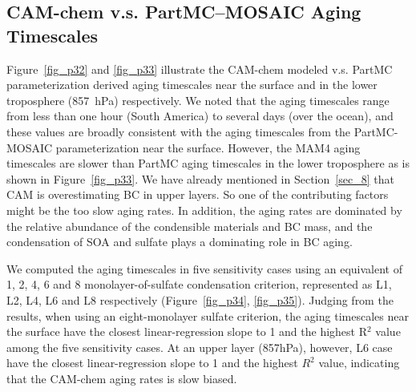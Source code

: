 \documentclass[12pt, fullpage]{uiucthesis2009}
\begin{document}
	\subsection{CAM-chem v.s. PartMC--MOSAIC Aging Timescales}
	Figure~\ref{fig_p32} and \ref{fig_p33} illustrate the CAM-chem modeled v.s. PartMC parameterization derived aging timescales near the surface and in the lower troposphere (857~hPa) respectively. We noted that the aging timescales range from less than one hour (South America) to several days (over the ocean), and these values are broadly consistent with the aging timescales from the PartMC-MOSAIC parameterization near the surface. However, the MAM4 aging timescales are slower than PartMC aging timescales in the lower troposphere as is shown in Figure~\ref{fig_p33}. We have already mentioned in Section~\ref{sec_8} that CAM is overestimating BC in upper layers. So one of the contributing factors might be the too slow aging rates. In addition, the aging rates are dominated by the relative abundance of the condensible materials and BC mass, and the condensation of SOA and sulfate plays a dominating role in BC aging.
	
	We computed the aging timescales in five sensitivity cases using an equivalent of 1, 2, 4, 6 and 8 monolayer-of-sulfate condensation criterion, represented as L1, L2, L4, L6 and L8 respectively (Figure~\ref{fig_p34}, \ref{fig_p35}). Judging from the results, when using an eight-monolayer sulfate criterion, the aging timescales near the surface have the closest linear-regression slope to 1 and the highest R$^2$ value among the five sensitivity cases. At an upper layer (857hPa), however, L6 case have the closest linear-regression slope to 1 and the highest $R^2$ value, indicating that the CAM-chem aging rates is slow biased. 
\end{document}
